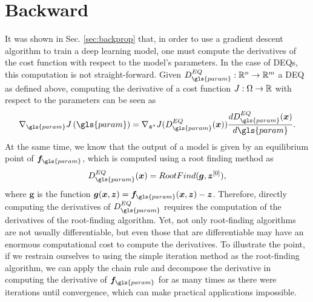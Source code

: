 \section{Backward}\label{sec:deq-backward}

It was shown in Sec. \ref{sec:backprop} that, in order to use a gradient descent algorithm to train a deep learning model, one must compute the derivatives of the cost function with respect to the model's parameters.
In the case of \gls{DEQ}s, this computation is not straight-forward.
Given $D^{EQ}_{\gls{param}}:\R^{n}\to \R^{m}$ a \gls{DEQ} as defined above, computing the derivative of a cost function $J:\Omega\to \mathbb{R}$ with respect to the parameters can be seen as \[
    \nabla_{\gls{param}} J\left( \gls{param} \right) = \nabla_{\bm{z}^{\star}} J(D^{EQ}_{\gls{param}}(\bm{x})) \frac{d D^{EQ}_{\gls{param}}(\bm{x})}{d\gls{param}}
.\] 
At the same time, we know that the output of a model is given by an equilibrium point of $\bm{f}_{\gls{param}}$, which is computed using a root finding method as \[
    D^{EQ}_{\gls{param}}(\bm{x}) = RootFind(\bm{g}, \bm{z}^{[0]})
,\] where $\bm{g}$ is the function $\bm{g}(\bm{x},\bm{z}) = \bm{f}_{\gls{param}}(\bm{x},\bm{z}) - \bm{z}$.
Therefore, directly computing the derivatives of $D^{EQ}_{\gls{param}}$ requires the computation of the derivatives of the root-finding algorithm.
Yet, not only root-finding algorithms are not usually differentiable, but even those that are differentiable may have an enormous computational cost to compute the derivatives.
To illustrate the point, if we restrain ourselves to using the simple iteration method as the root-finding algorithm, we can apply the chain rule and decompose the derivative in computing the derivative of $\bm{f}_{\gls{param}}$ for as many times as there were iterations until convergence, which can make practical applications impossible.

